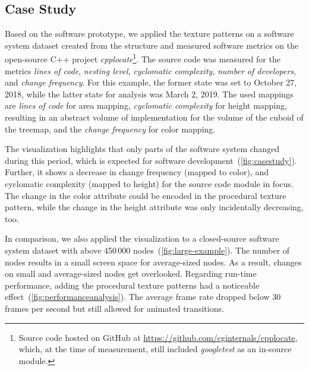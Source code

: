 \documentclass[smallextended,natbib]{svjour3}       %
\begin{document}
\subsection{Case Study}
Based on the software prototype, we applied the texture patterns on a software system dataset created from the structure and measured software metrics on the open-source C++ project \emph{cpplocate}\footnote{Source code hosted on GitHub at \href{https://github.com/cginternals/cpplocate}{https://github.com/cginternals/cpplocate}, which, at the time of measurement, still included \emph{googletest} as an in-source module.}.
The source code was measured for the metrics \emph{lines of code}, \emph{nesting level}, \emph{cyclomatic complexity}, \emph{number of developers}, and \emph{change frequency}.
For this example, the former state was set to October 27, 2018, while the latter state for analysis was March 2, 2019.
The used mappings are \emph{lines of code} for area mapping, \emph{cyclomatic complexity} for height mapping, resulting in an abstract volume of implementation for the volume of the cuboid of the treemap, and the \emph{change frequency} for color mapping. 

The visualization highlights that only parts of the software system changed during this period, which is expected for software development~(\autoref{fig:casestudy}).
Further, it shows a decrease in change frequency (mapped to color), and cyclomatic complexity (mapped to height) for the source code module in focus.
The change in the color attribute could be encoded in the procedural texture pattern, while the change in the height attribute was only incidentally decreasing, too.

In comparison, we also applied the visualization to a closed-source software system dataset with above 450\,000 nodes~(\autoref{fig:large-example}).
The number of nodes results in a small screen space for average-sized nodes.
As a result, changes on small and average-sized nodes get overlooked.
Regarding run-time performance, adding the procedural texture patterns had a noticeable effect~(\autoref{fig:performanceanalysis}). The average frame rate dropped below 30 frames per second but still allowed for animated transitions.
\end{document}
